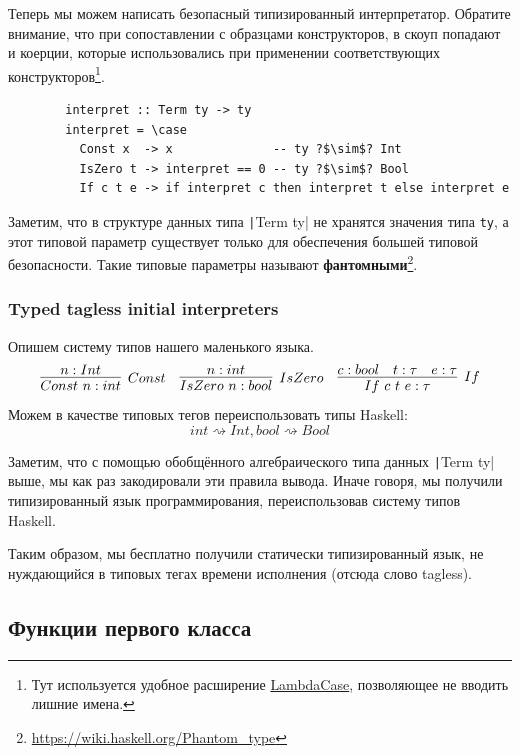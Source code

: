 \documentclass[12pt]{article}
\newcommand{\vocab}[1]{\textbf{#1}} %
\begin{document}
    Теперь мы можем написать безопасный типизированный интерпретатор.
    Обратите внимание, что при сопоставлении с образцами конструкторов, в скоуп попадают и коерции, которые использовались при применении соответствующих конструкторов\footnote{Тут используется удобное расширение \href{https://downloads.haskell.org/~ghc/9.0.1/docs/html/users_guide/exts/lambda_case.html}{LambdaCase}, позволяющее не вводить лишние имена.}.
    \begin{verbatim}
        interpret :: Term ty -> ty
        interpret = \case
          Const x  -> x              -- ty ?$\sim$? Int
          IsZero t -> interpret == 0 -- ty ?$\sim$? Bool
          If c t e -> if interpret c then interpret t else interpret e
    \end{verbatim}

    Заметим, что в структуре данных типа \texttt|Term ty| не хранятся значения типа \texttt{ty}, а этот типовой параметр существует только для обеспечения большей типовой безопасности.
    Такие типовые параметры называют \vocab{фантомными}\footnote{\url{https://wiki.haskell.org/Phantom_type}}.

    \subsubsection{Typed tagless initial interpreters}

    Опишем систему типов нашего маленького языка.
    \begin{equation*}{}
        \infer[Const]{Const~n : int}{n : Int}
        \quad
        \infer[IsZero]{IsZero~n : bool}{n : int}
        \quad
        \infer[If]{If~c~t~e : \tau}{c : bool & t : \tau & e : \tau}
    \end{equation*}
    Можем в качестве типовых тегов переиспользовать типы Haskell: \[int \rightsquigarrow Int, bool \rightsquigarrow Bool\]

    Заметим, что с помощью обобщённого алгебраического типа данных \texttt|Term ty| выше, мы как раз закодировали эти правила вывода.
    Иначе говоря, мы получили типизированный язык программирования, переиспользовав систему типов Haskell.

    Таким образом, мы бесплатно получили статически типизированный язык, не нуждающийся в типовых тегах времени исполнения (отсюда слово tagless).

    \subsection{Функции первого класса} \label{subsec:first-class-functions}
\end{document}

